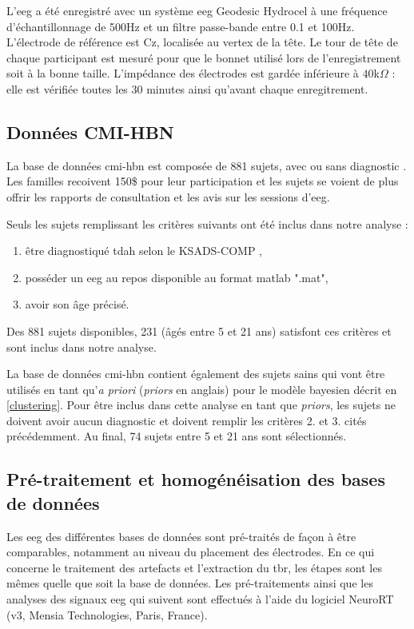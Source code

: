 L'\gls{eeg} a été enregistré avec un système \gls{eeg} Geodesic Hydrocel à une fréquence d'échantillonnage de 500Hz et un filtre passe-bande entre 0.1 et 100Hz. 
L'électrode de référence est Cz, localisée au vertex de la tête. Le tour de tête de chaque participant est mesuré pour que le bonnet utilisé lors de l'enregistrement 
soit à la bonne taille. L'impédance des électrodes est gardée inférieure à $40$k$\Omega$ : elle est vérifiée toutes les 30 minutes ainsi qu'avant chaque enregitrement.

\subsection{Données CMI-HBN}
La base de données \gls{cmi-hbn} est composée de 881 sujets, avec ou sans diagnostic \citep{Alexander2017, Alexander2017b}. Les familles recoivent 150\$ pour leur participation 
et les sujets se voient de plus offrir les rapports de consultation et les avis sur les sessions d'\gls{eeg}.

Seuls les sujets remplissant les critères suivants ont été inclus dans notre analyse :
\begin{enumerate}
\item être diagnostiqué \gls{tdah} selon le KSADS-COMP \citep{Kaufman1997},
\item posséder un \gls{eeg} au repos disponible au format matlab ".mat",
\item avoir son âge précisé.
\end{enumerate}

Des 881 sujets disponibles, 231 (âgés entre 5 et 21 ans) satisfont ces critères et sont inclus dans notre analyse.

La base de données \gls{cmi-hbn} contient également des sujets sains qui vont être utilisés en tant qu'\textit{a priori} (\textit{priors} en anglais) pour le
modèle bayesien décrit en \ref{clustering}. Pour être inclus dans cette analyse en tant que \textit{priors}, les sujets ne doivent avoir aucun diagnostic 
et doivent remplir les critères 2. et 3. cités précédemment. Au final, 74 sujets entre 5 et 21 ans sont sélectionnés. 

\subsection{Pré-traitement et homogénéisation des bases de données} \label{pré-traitement TBR}
Les \gls{eeg} des différentes bases de données sont pré-traités de façon à être comparables, notamment au niveau du placement des électrodes.
En ce qui concerne le traitement des artefacts et l'extraction du \gls{tbr}, les étapes sont les mêmes quelle que soit la base de données. 
Les pré-traitements ainsi que les analyses des signaux \gls{eeg} qui suivent sont effectués à l'aide du logiciel NeuroRT (v3, Mensia Technologies, 
Paris, France).

